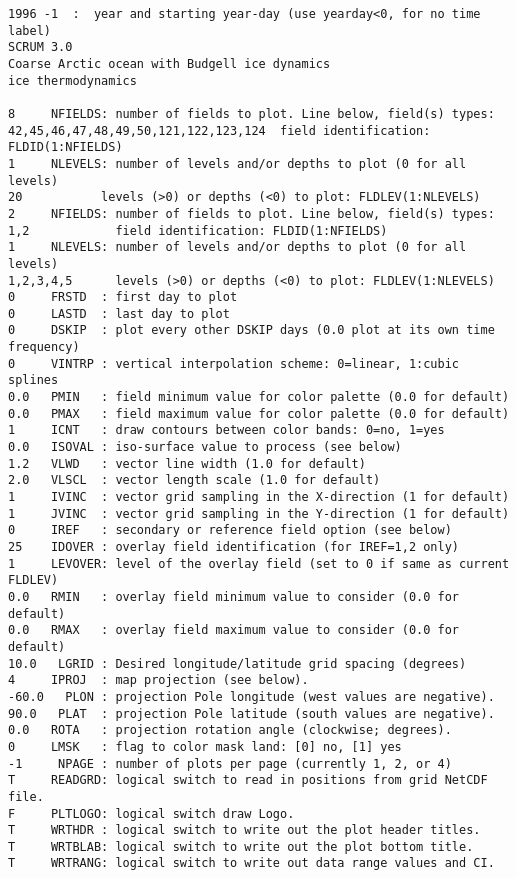 \begin{verbatim}
1996 -1  :  year and starting year-day (use yearday<0, for no time label)
SCRUM 3.0
Coarse Arctic ocean with Budgell ice dynamics
ice thermodynamics

8     NFIELDS: number of fields to plot. Line below, field(s) types:
42,45,46,47,48,49,50,121,122,123,124  field identification:
FLDID(1:NFIELDS)
1     NLEVELS: number of levels and/or depths to plot (0 for all levels)
20           levels (>0) or depths (<0) to plot: FLDLEV(1:NLEVELS)
2     NFIELDS: number of fields to plot. Line below, field(s) types:
1,2            field identification: FLDID(1:NFIELDS)
1     NLEVELS: number of levels and/or depths to plot (0 for all levels)
1,2,3,4,5      levels (>0) or depths (<0) to plot: FLDLEV(1:NLEVELS)
0     FRSTD  : first day to plot
0     LASTD  : last day to plot
0     DSKIP  : plot every other DSKIP days (0.0 plot at its own time frequency)
0     VINTRP : vertical interpolation scheme: 0=linear, 1:cubic splines
0.0   PMIN   : field minimum value for color palette (0.0 for default)
0.0   PMAX   : field maximum value for color palette (0.0 for default)
1     ICNT   : draw contours between color bands: 0=no, 1=yes
0.0   ISOVAL : iso-surface value to process (see below)
1.2   VLWD   : vector line width (1.0 for default)
2.0   VLSCL  : vector length scale (1.0 for default)
1     IVINC  : vector grid sampling in the X-direction (1 for default)
1     JVINC  : vector grid sampling in the Y-direction (1 for default)
0     IREF   : secondary or reference field option (see below)
25    IDOVER : overlay field identification (for IREF=1,2 only)
1     LEVOVER: level of the overlay field (set to 0 if same as current FLDLEV)
0.0   RMIN   : overlay field minimum value to consider (0.0 for default)
0.0   RMAX   : overlay field maximum value to consider (0.0 for default)
10.0   LGRID : Desired longitude/latitude grid spacing (degrees)
4     IPROJ  : map projection (see below).
-60.0   PLON : projection Pole longitude (west values are negative).
90.0   PLAT  : projection Pole latitude (south values are negative).
0.0   ROTA   : projection rotation angle (clockwise; degrees).
0     LMSK   : flag to color mask land: [0] no, [1] yes
-1     NPAGE : number of plots per page (currently 1, 2, or 4)  
T     READGRD: logical switch to read in positions from grid NetCDF file.
F     PLTLOGO: logical switch draw Logo.
T     WRTHDR : logical switch to write out the plot header titles.
T     WRTBLAB: logical switch to write out the plot bottom title.
T     WRTRANG: logical switch to write out data range values and CI.


\end{verbatim}
